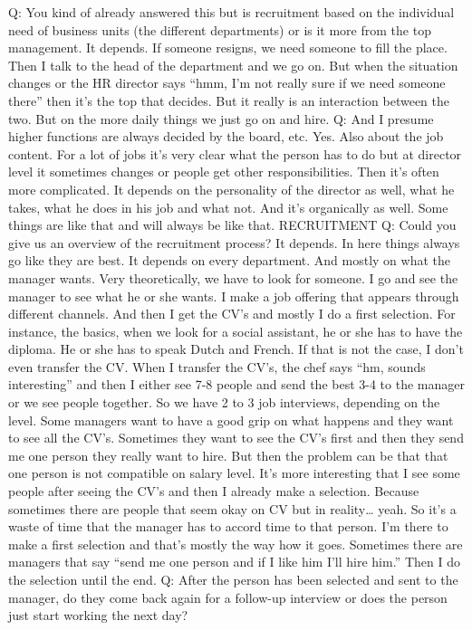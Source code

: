 \documentclass[a4paper,fleqn,11pt,dvips,titlepage]{article}
\numberwithin{figure}{section}
\numberwithin{equation}{section}
\begin{document}
Q: You kind of already answered this but is recruitment based on the individual need of business units (the different departments) or is it more from the top management.
It depends. If someone resigns, we need someone to fill the place. Then I talk to the head of the department and we go on. But when the situation changes or the HR director says “hmm, I’m not really sure if we need someone there” then it’s the top that decides. But it really is an interaction between the two. But on the more daily things we just go on and hire. 
Q: And I presume higher functions are always decided by the board, etc. 
Yes. Also about the job content. For a lot of jobs it’s very clear what the person has to do but at director level it sometimes changes or people get other responsibilities. Then it’s often more complicated. It depends on the personality of the director as well, what he takes, what he does in his job and what not. And it’s organically as well. Some things are like that and will always be like that.
RECRUITMENT
Q: Could you give us an overview of the recruitment process?
It depends. In here things always go like they are best. It depends on every department. And mostly on what the manager wants. Very theoretically, we have to look for someone. I go and see the manager to see what he or she wants. I make a job offering that appears through different channels. And then I get the CV’s and mostly I do a first selection. For instance, the basics, when we look for a social assistant, he or she has to have the diploma. He or she has to speak Dutch and French. If that is not the case, I don’t even transfer the CV. When I transfer the CV’s, the chef says “hm, sounds interesting” and then I either see 7-8 people and send the best 3-4 to the manager or we see people together. So we have 2 to 3 job interviews, depending on the level. Some managers want to have a good grip on what happens and they want to see all the CV’s. Sometimes they want to see the CV’s first and then they send me one person they really want to hire. But then the problem can be that that one person is not compatible on salary level. It’s more interesting that I see some people after seeing the CV’s and then I already make a selection. Because sometimes there are people that seem okay on CV but in reality… yeah. So it’s a waste of time that the manager has to accord time to that person. I’m there to make a first selection and that’s mostly the way how it goes. Sometimes there are managers that say “send me one person and if I like him I’ll hire him.” Then I do the selection until the end. 
Q: After the person has been selected and sent to the manager, do they come back again for a follow-up interview or does the person just start working the next day?
\end{document}
